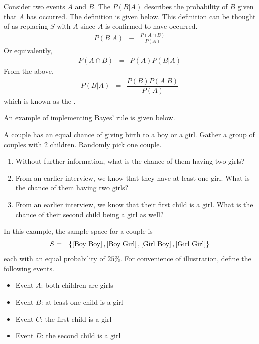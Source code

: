 Consider two events $A$ and $B$. The  $P(B|A)$ describes the probability of $B$ given that $A$ has occurred. The definition is given below. This definition can be thought of as replacing $S$ with $A$ since $A$ is confirmed to have occurred.
\begin{eqnarray}
  P(B|A) &\equiv& \frac{P(A\cap B)}{P(A)} \nonumber
\end{eqnarray}
Or equivalently,
\begin{eqnarray}
  P(A\cap B) &=& P(A)P(B|A) \nonumber
\end{eqnarray}
From the above,
\begin{eqnarray}
  P(B|A) &=& \dfrac{P(B)P(A|B)}{P(A)} \nonumber
\end{eqnarray}
which is known as the .

An example of implementing Bayes' rule is given below.

\begin{shortbox}

A couple has an equal chance of giving birth to a boy or a girl. Gather a group of couples with 2 children. Randomly pick one couple.

\begin{enumerate}
	\item Without further information, what is the chance of them having two girls?
	\item From an earlier interview, we know that they have at least one girl. What is the chance of them having two girls?
	\item From an earlier interview, we know that their first child is a girl. What is the chance of their second child being a girl as well?
\end{enumerate}

\end{shortbox}

In this example, the sample space for a couple is 
\begin{eqnarray}
S &=& \left\{\left[\textup{Boy Boy}\right], \left[\textup{Boy Girl}\right], \left[\textup{Girl Boy}\right], \left[\textup{Girl Girl}\right]\right\} \label{eq:probsetexp}
\end{eqnarray}
each with an equal probability of $25\%$. For convenience of illustration, define the following events.
\begin{itemize}
	\item Event $A$: both children are girls
	\item Event $B$: at least one child is a girl
	\item Event $C$: the first child is a girl
	\item Event $D$: the second child is a girl
\end{itemize}

